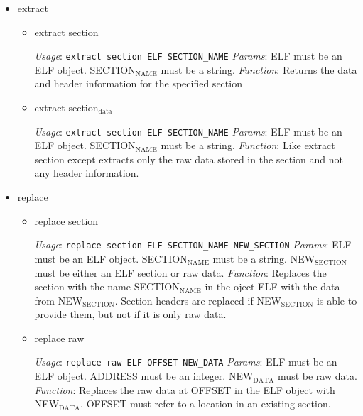 \documentclass[11pt]{article}
\begin{document}
\begin{itemize}
\item extract\\
\label{sec-2.1.2.4}

\begin{itemize}

\item extract section\\
\label{sec-2.1.2.4.1}

      \emph{Usage}: \texttt{extract section ELF SECTION\_NAME}
      \emph{Params}: ELF must be an ELF object. SECTION$_{\mathrm{NAME}}$ must be a
                string. 
      \emph{Function}: Returns the data and header information for the
                  specified section

\item extract section$_{\mathrm{data}}$\\
\label{sec-2.1.2.4.2}

      \emph{Usage}: \texttt{extract section ELF SECTION\_NAME}
      \emph{Params}: ELF must be an ELF object. SECTION$_{\mathrm{NAME}}$ must be a
                string. 
      \emph{Function}: Like extract section except extracts only the raw
                 data stored in the section and not any header information.
\end{itemize} %

\item replace\\
\label{sec-2.1.2.5}

\begin{itemize}

\item replace section\\
\label{sec-2.1.2.5.1}

      \emph{Usage}: \texttt{replace section ELF SECTION\_NAME NEW\_SECTION}
      \emph{Params}: ELF must be an ELF object. SECTION$_{\mathrm{NAME}}$ must be a
      string. NEW$_{\mathrm{SECTION}}$ must be either an ELF section or raw data.
      \emph{Function}: Replaces the section with the name SECTION$_{\mathrm{NAME}}$ in
      the oject ELF with the data from NEW$_{\mathrm{SECTION}}$. Section headers
      are replaced if NEW$_{\mathrm{SECTION}}$ is able to provide them, but not if
      it is only raw data.
                   

\item replace raw\\
\label{sec-2.1.2.5.2}

      \emph{Usage}: \texttt{replace raw ELF OFFSET NEW\_DATA}
      \emph{Params}: ELF must be an ELF object. ADDRESS must be an
                integer. NEW$_{\mathrm{DATA}}$ must be raw data.
      \emph{Function}: Replaces the raw data at OFFSET in the ELF object
                  with NEW$_{\mathrm{DATA}}$. OFFSET must refer to a location in an
                  existing section.
\end{itemize} %


\end{itemize}
\end{document}

